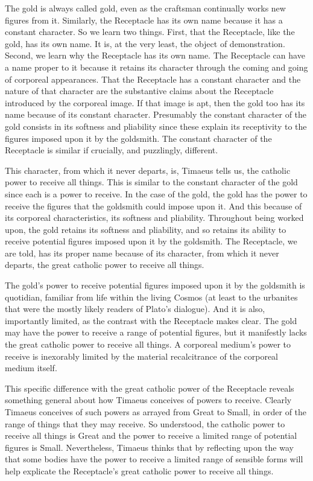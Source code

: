 The gold is always called gold, even as the craftsman continually works new figures from it. Similarly, the Receptacle has its own name because it has a constant character. So we learn two things. First, that the Receptacle, like the gold, has its own name. It is, at the very least, the object of demonstration. Second, we learn why the Receptacle has its own name. The Receptacle can have a name proper to it because it retains its character through the coming and going of corporeal appearances. That the Receptacle has a constant character and the nature of that character are the substantive claims about the Receptacle introduced by the corporeal image. If that image is apt, then the gold too has its name because of its constant character. Presumably the constant character of the gold consists in its softness and pliability since these explain its receptivity to the figures imposed upon it by the goldsmith. The constant character of the Receptacle is similar if crucially, and puzzlingly, different.

This character, from which it never departs, is, Timaeus tells us, the catholic power to receive all things. This is similar to the constant character of the gold since each is a power to receive. In the case of the gold, the gold has the power to receive the figures that the goldsmith could impose upon it. And this because of its corporeal characteristics, its softness and pliability. Throughout being worked upon, the gold retains its softness and pliability, and so retains its ability to receive potential figures imposed upon it by the goldsmith. The Receptacle, we are told, has its proper name because of its character, from which it never departs, the great catholic power to receive all things.

The gold's power to receive potential figures imposed upon it by the goldsmith is quotidian, familiar from life within the living Cosmos (at least to the urbanites that were the mostly likely readers of Plato's dialogue). And it is also, importantly limited, as the contrast with the Receptacle makes clear. The gold may have the power to receive a range of potential figures, but it manifestly lacks the great catholic power to receive all things. A corporeal medium's power to receive is inexorably limited by the material recalcitrance of the corporeal medium itself. 

This specific difference with the great catholic power of the Receptacle reveals something general about how Timaeus conceives of powers to receive. Clearly Timaeus conceives of such powers as arrayed from Great to Small, in order of the range of things that they may receive. So understood, the catholic power to receive all things is Great and the power to receive a limited range of potential figures is Small. Nevertheless, Timaeus thinks that by reflecting upon the way that some bodies have the power to receive a limited range of sensible forms will help explicate the Receptacle's great catholic power to receive all things.


